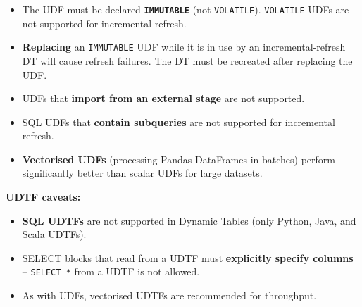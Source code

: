 \documentclass[
  letterpaper,
  DIV=11,
  numbers=noendperiod]{scrreprt}
\providecommand{\tightlist}{%
  \setlength{\itemsep}{0pt}\setlength{\parskip}{0pt}}\usepackage{longtable,booktabs,array}
\begin{document}
\begin{itemize}
\tightlist
\item
  The UDF must be declared \textbf{\texttt{IMMUTABLE}} (not
  \texttt{VOLATILE}). \texttt{VOLATILE} UDFs are not supported for
  incremental refresh.
\item
  \textbf{Replacing} an \texttt{IMMUTABLE} UDF while it is in use by an
  incremental-refresh DT will cause refresh failures. The DT must be
  recreated after replacing the UDF.
\item
  UDFs that \textbf{import from an external stage} are not supported.
\item
  SQL UDFs that \textbf{contain subqueries} are not supported for
  incremental refresh.
\item
  \textbf{Vectorised UDFs} (processing Pandas DataFrames in batches)
  perform significantly better than scalar UDFs for large datasets.
\end{itemize}

\textbf{UDTF caveats:}

\begin{itemize}
\tightlist
\item
  \textbf{SQL UDTFs} are not supported in Dynamic Tables (only Python,
  Java, and Scala UDTFs).
\item
  SELECT blocks that read from a UDTF must \textbf{explicitly specify
  columns} -- \texttt{SELECT\ *} from a UDTF is not allowed.
\item
  As with UDFs, vectorised UDTFs are recommended for throughput.
\end{itemize}
\end{document}
